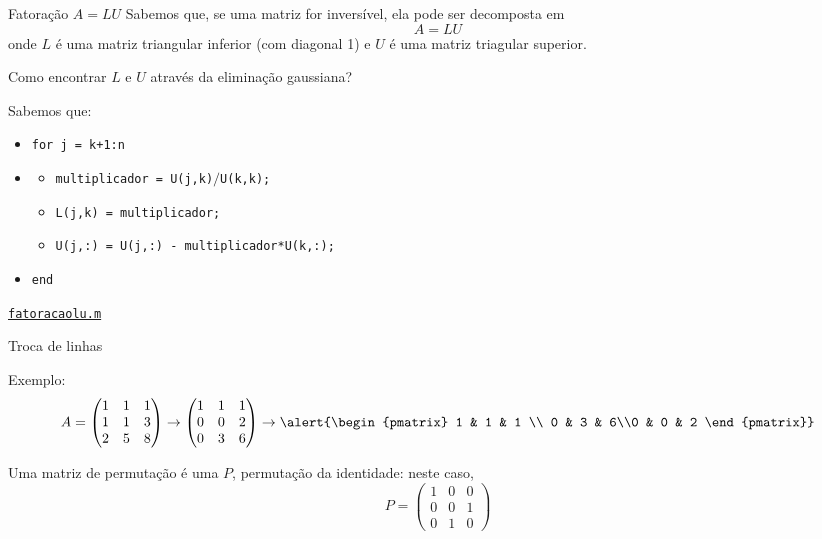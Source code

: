 \documentclass[hyperref={pdfpagelabels=false}]{beamer}
\begin{document}
\begin{frame}{Fatoração $A=LU$}
   Sabemos que, se uma matriz for inversível, ela pode ser decomposta em 
   $$A=LU$$
   onde $L$ é uma matriz triangular inferior (com diagonal 1) e $U$ é uma matriz triagular superior. 

   Como encontrar $L$ e $U$ através da eliminação gaussiana?

   Sabemos que:

   \begin{itemize}
      \item[] \texttt{for j = k+1:n}
      \item[] 
      \begin{itemize}
         \item[] \texttt{multiplicador = U(j,k)$/$U(k,k);}
         \item[] \alert{\texttt{L(j,k) = multiplicador;}}
         \item[] \texttt{U(j,:) = U(j,:) - multiplicador*U(k,:);}
      \end{itemize}
      \item[] \texttt{end}
   \end{itemize}
   \begin{center}
     \href{listings/fatoracaolu.m}{\underline{\texttt{fatoracaolu.m}}}
   \end{center}
\end{frame}

\begin{frame}{Troca de linhas}

  Exemplo: 
  $$A = \begin{pmatrix} 1 & 1 & 1 \\ 1 & 1 & 3 \\ 2 & 5 & 8 \end{pmatrix} \rightarrow \begin{pmatrix} 1 & 1 & 1 \\ 0 & 0 & 2 \\ 0 & 3 & 6 \end{pmatrix}\rightarrow \alert{\begin{pmatrix} 1 & 1 & 1 \\ 0 & 3 & 6\\0 & 0 & 2  \end{pmatrix}}$$
  
  Uma matriz de permutação é uma $P$, permutação da identidade: neste caso,
  $$ P = \begin{pmatrix} 1 &0&0\\ 0&0&1\\0&1&0\end{pmatrix}$$
\end{frame}
\end{document}
